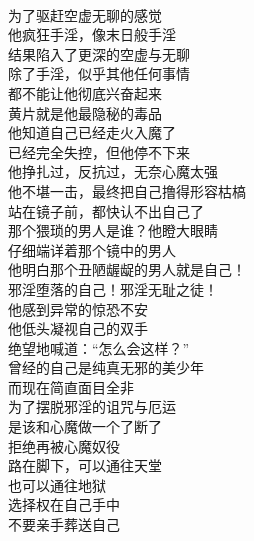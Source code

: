 \begin{poem}[告别手淫洪荒岁月]
    \begin{multicols}{2}
        \centering~\\
        为了驱赶空虚无聊的感觉 \\ 他疯狂手淫，像末日般手淫 \\ 结果陷入了更深的空虚与无聊 \\ 除了手淫，似乎其他任何事情 \\ 都不能让他彻底兴奋起来 \\ 黄片就是他最隐秘的毒品 \\ 他知道自己已经走火入魔了 \\ 已经完全失控，但他停不下来 \\ 他挣扎过，反抗过，无奈心魔太强 \\ 他不堪一击，最终把自己撸得形容枯槁 \\ 站在镜子前，都快认不出自己了 \\ 那个猥琐的男人是谁？他瞪大眼睛 \\ 仔细端详着那个镜中的男人 \\ 他明白那个丑陋龌龊的男人就是自己！ \\ 邪淫堕落的自己！邪淫无耻之徒！ \\ 他感到异常的惊恐不安 \\ 他低头凝视自己的双手 \\ 绝望地喊道：“怎么会这样？” \\ 曾经的自己是纯真无邪的美少年 \\ 而现在简直面目全非 \\ 为了摆脱邪淫的诅咒与厄运 \\ 是该和心魔做一个了断了 \\ 拒绝再被心魔奴役 \\ 路在脚下，可以通往天堂 \\ 也可以通往地狱 \\ 选择权在自己手中 \\ 不要亲手葬送自己
    \end{multicols}
\end{poem}


